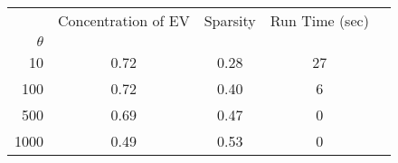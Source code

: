 \begin{tabular}{r|cccc}
\toprule
{} &  Concentration of EV &  Sparsity & Run Time (sec) \\
$\theta$ &                      &           &                \\
\midrule
10       &                 0.72 &      0.28 &             27 \\
100      &                 0.72 &      0.40 &              6 \\
500      &                 0.69 &      0.47 &              0 \\
1000     &                 0.49 &      0.53 &              0 \\
\bottomrule
\end{tabular}
